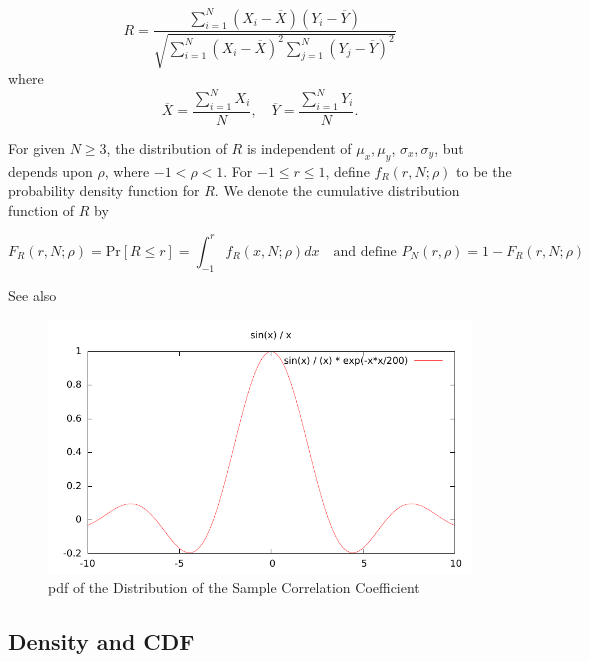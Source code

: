 \begin{equation}
	R = \frac{\sum_{i=1}^{N} (X_i -  \overline{X}) (Y_i -  \overline{Y})}{\sqrt{\sum_{i=1}^{N} (X_i - \overline{X})^2 \sum_{j=1}^{N} (Y_j - \overline{Y})^2}}
\end{equation}
where
\begin{equation}
	\overline{X} = \frac{\sum_{i=1}^{N} X_i}{N}, \quad \overline{Y} = \frac{\sum_{i=1}^{N} Y_i}{N}.
\end{equation}

For given $N \geq 3$, the distribution of $R$ is independent of  $\mu_x, \mu_y$, $\sigma_x, \sigma_y$, but depends upon  $\rho$, where $-1 < \rho < 1$.
For $-1 \leq r \leq 1$, define $f_R(r, N; \rho)$ to be the probability density function for $R$. We denote the cumulative distribution function of $R$ by \citep{odeh_1986}

\begin{equation}
	F_R(r, N; \rho) = \text{Pr}[R \leq r] = \int_{-1}^{r}{f_R(x, N; \rho) dx} \quad \text{and define } P_N(r, \rho) = 1 - F_R(r, N; \rho)
\end{equation}

See also \cite{subrahmaniam_extensions_1983}



\begin{figure}[ht]
	\centering
	\includegraphics{Charts/pdf/PearsonRho.pdf}
	\caption{pdf of the Distribution of the Sample Correlation Coefficient}
	\label{Fig pdf of the Distribution of the Sample Correlation Coefficient}
\end{figure}



\subsection{Density and CDF}

